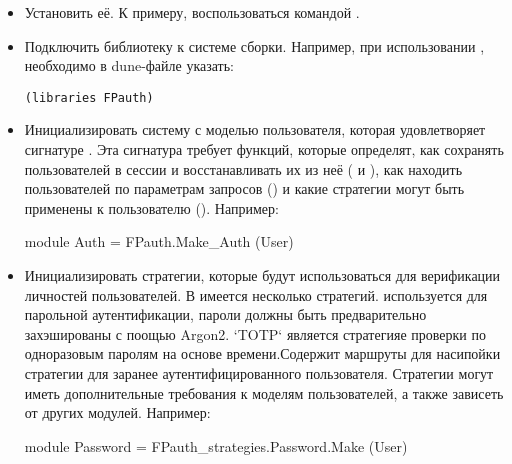 \begin{itemize}\item{Установить её. К примеру, воспользоваться командой .}%
\item{Подключить библиотеку к системе сборки. Например, при использовании , необходимо в dune-файле указать:

\begin{verbatim}(libraries FPauth)\end{verbatim}%
}\end{itemize}%
\begin{itemize}\item{Инициализировать систему с моделью пользователя, которая удовлетворяет сигнатуре \hyperref[page-FPauth-core-module-FPauth+u+core-module-Auth+u+sign-module-type-MODEL]{}. Эта сигнатура требует функций, которые определят, как сохранять пользователей в сессии и восстанавливать их из неё ( и ), как находить пользователей по параметрам запросов () и какие стратегии могут быть применены к пользователю (). Например:\medbreak
\begin{ocamlcodeblock}
module Auth = FPauth.Make_Auth (User)
\end{ocamlcodeblock}\medbreak
}\end{itemize}%
\begin{itemize}\item{Инициализировать стратегии, которые будут использоваться для верификации личностей пользователей. В \hyperref[page-FPauth-strategies-module-FPauth+u+strategies]{} имеется несколько стратегий.  используется для парольной аутентификации, пароли должны быть предварительно захэшированы с поощью Argon2. `TOTP` является стратегияе проверки по одноразовым паролям на основе времени.Содержит маршруты для насипойки стратегии для заранее аутентифицированного пользователя. Стратегии могут иметь дополнительные требования к моделям пользователей, а также зависеть от других модулей. Например:\medbreak
\begin{ocamlcodeblock}
module Password = FPauth_strategies.Password.Make (User)
\end{ocamlcodeblock}\medbreak
}\end{itemize}%

